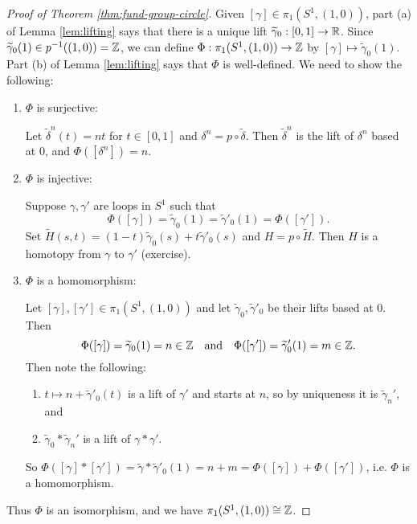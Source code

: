 \begin{proof}[Proof of Theorem \ref{thm:fund-group-circle}]
  Given $[\gamma] \in \pi_1(S^1, (1, 0))$, part (a) of Lemma \ref{lem:lifting} says that there is a unique lift $\widetilde{\gamma}_0 : [0, 1] \to \mathbb{R}$.
  Since $\widetilde{\gamma}_0(1) \in p^{-1}((1, 0)) = \mathbb{Z}$,
  we can define $\Phi : \pi_1(S^1, (1, 0)) \to \mathbb{Z}$ by
  $[\gamma] \mapsto \widetilde{\gamma}_0(1)$.
  Part (b) of Lemma \ref{lem:lifting} says that $\Phi$ is
  well-defined. We need to show the following:
  \begin{enumerate}
    \item $\Phi$ is surjective:
      
      Let $\widetilde{\delta}^n(t) = nt$ for
      $t \in [0, 1]$ and $\delta^n = p \circ \widetilde{\delta}$.
      Then $\widetilde{\delta}^n$ is the lift of $\delta^n$ based at $0$, and
      $\Phi([\delta^n]) = n$.
    \item $\Phi$ is injective:

      Suppose $\gamma, \gamma'$ are loops in $S^1$
      such that
      \[
        \Phi([\gamma]) = \widetilde{\gamma}_0(1) = \widetilde{\gamma}'_0(1) = \Phi([\gamma']).
      \]
      Set $\widetilde{H}(s, t) = (1 - t) \widetilde{\gamma}_0(s) + t \widetilde{\gamma}'_0(s)$
      and $H = p \circ \widetilde{H}$. Then $H$ is a
      homotopy from $\gamma$ to $\gamma'$ (exercise).
    \item $\Phi$ is a homomorphism:

      Let $[\gamma], [\gamma'] \in \pi_1(S^1, (1, 0))$
      and let $\widetilde{\gamma}_0, \widetilde{\gamma}'_0$
      be their lifts based at $0$. Then
      \[
        \Phi([\gamma]) = \widetilde{\gamma}_0(1) = n \in \mathbb{Z} \quad \text{and} \quad
        \Phi([\gamma']) = \widetilde{\gamma}'_0(1) = m \in \mathbb{Z}.
      \]
      Then note the following:
      \begin{enumerate}
        \item $t \mapsto n + \widetilde{\gamma}'_0(t)$
          is a lift of $\gamma'$ and starts at $n$,
          so by uniqueness it is $\widetilde{\gamma}_n'$,
          and
        \item $\widetilde{\gamma}_0 * \widetilde{\gamma}_n'$ is a lift of $\gamma * \gamma'$.
      \end{enumerate}
      So $\Phi([\gamma] * [\gamma']) = \widetilde{\gamma} * \widetilde{\gamma}'_0(1) = n + m = \Phi([\gamma]) + \Phi([\gamma'])$,
      i.e. $\Phi$ is a homomorphism.
  \end{enumerate}
  Thus $\Phi$ is an isomorphism, and we have
  $\pi_1(S^1, (1, 0)) \cong \mathbb{Z}$.
\end{proof}
